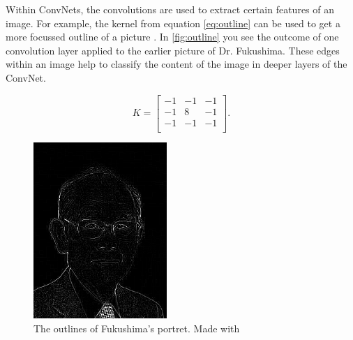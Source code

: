 Within ConvNets, the convolutions are used to extract certain features of an image. For example, the kernel from equation \eqref{eq:outline} can be used to get a more focussed outline of a picture \cite{visual}. In \autoref{fig:outline} you see the outcome of one convolution layer applied to the earlier picture of Dr. Fukushima. These edges within an image help to classify the content of the image in deeper layers of the ConvNet.

\begin{equation}\label{eq:outline}
    K =
    \begin{bmatrix}
     -1 & -1 & -1 \\
     -1 & 8 & -1 \\
     -1 & -1 & -1 \\
    \end{bmatrix}.
\end{equation}

\begin{figure}
    \centering
    \includegraphics[width=0.45\textwidth]{images/Fukushima-outline.png}
    \caption{The outlines of Fukushima's portret. Made with \cite{visual}}
    \label{fig:outline}
\end{figure}














